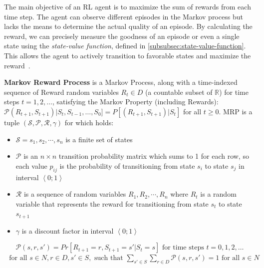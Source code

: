 \documentclass[../xlapes02]{subfiles}
\begin{document}
    The main objective of an RL agent is to maximize the sum of rewards from each time step. The agent can observe different episodes in the Markov process but lacks the means to determine the actual quality of an episode. By calculating the reward, we can precisely measure the goodness of an episode or even a single state using the \emph{state-value function}, defined in \cref{subsubsec:state-value-function}. This allows the agent to actively transition to favorable states and maximize the reward~\cite{rao2022foundations}.


    \begin{definition}
        \textbf{Markov Reward Process} is a Markov Process, along with a time-indexed sequence of Reward random variables $R_t \in D$ (a countable subset of $\mathbb{R}$) for time steps $t = 1, 2, \ldots$, satisfying the Markov Property (including Rewards): $\mathcal{P}(R_{t+1},S_{t+1})|S_t,S_{t-1}, \ldots, S_0] = P[(R_{t+1}, S_{t+1})|S_t]$ for all $t \geq 0$. MRP is a tuple $(\mathcal{S},\mathcal{P},\mathcal{R},\gamma)$ for which holds:\cite{rao2022foundations}
        \begin{itemize}
            \item $\mathcal{S}=s_1,s_2,\cdots,s_n$ is a finite set of states
            \item $\mathcal{P}$ is an $n\times n$ transition probability matrix which sums to 1 for each row, so each value $p_{ij}$ is the probability of transitioning from state $s_i$ to state $s_j$ in interval $\left< 0;1 \right>$
            \item $\mathcal{R}$ is a sequence of random variables $R_1,R_2,\cdots,R_n$ where $R_t$ is a random variable that represents the reward for transitioning from state $s_t$ to state $s_{t+1}$
            \item $\gamma$ is a discount factor in interval $\left<0;1\right>$
        \end{itemize}
        \begin{equation}
            \mathcal{P}(s,r,s')=Pr\left[R_{t+1}=r,S_{t+1}=s'|S_t=s\right]\text{ for time steps }t=0,1,2,\ldots
        \end{equation}
        \begin{align*}
            \text{ for all }s\in N,r\in D,s'\in S,\text{ such that }\sum_{s'\in S}\sum_{r\in D}\mathcal{P}(s,r,s')=1\text{ for all }s\in N
        \end{align*}
    \end{definition}
\end{document}
